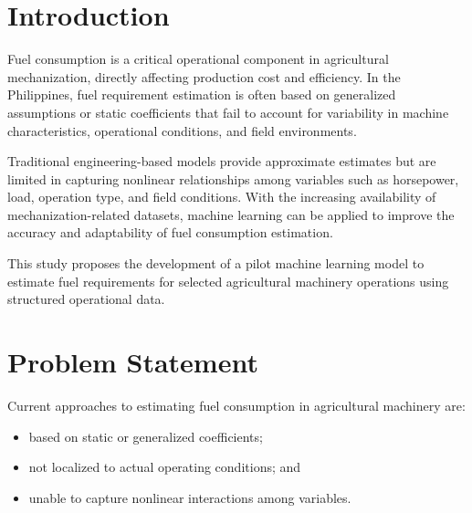 \documentclass[11pt,twocolumn]{article}
\begin{document}

\section*{Introduction}

Fuel consumption is a critical operational component in agricultural mechanization, directly affecting production cost and efficiency. In the Philippines, fuel requirement estimation is often based on generalized assumptions or static coefficients that fail to account for variability in machine characteristics, operational conditions, and field environments.

\vspace{10pt}

Traditional engineering-based models provide approximate estimates but are limited in capturing nonlinear relationships among variables such as horsepower, load, operation type, and field conditions. With the increasing availability of mechanization-related datasets, machine learning can be applied to improve the accuracy and adaptability of fuel consumption estimation.

\vspace{10pt}

This study proposes the development of a pilot machine learning model to estimate fuel requirements for selected agricultural machinery operations using structured operational data.

\section*{Problem Statement}

Current approaches to estimating fuel consumption in agricultural machinery are:
\begin{itemize}
\item based on static or generalized coefficients;
\item not localized to actual operating conditions; and
\item unable to capture nonlinear interactions among variables.
\end{itemize}
\end{document}
